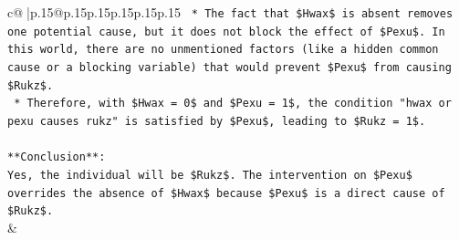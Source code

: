 \documentclass{article}
\begin{document}
{\begin{supertabular}{c@{$\;$}|p{.15\linewidth}@{}p{.15\linewidth}p{.15\linewidth}p{.15\linewidth}p{.15\linewidth}p{.15\linewidth}}
{{{\texttt{    *   The fact that \$Hwax\$ is absent removes one potential cause, but it does not block the effect of \$Pexu\$. In this world, there are no unmentioned factors (like a hidden common cause or a blocking variable) that would prevent \$Pexu\$ from causing \$Rukz\$.} \\
\texttt{    *   Therefore, with \$Hwax = 0\$ and \$Pexu = 1\$, the condition "hwax or pexu causes rukz" is satisfied by \$Pexu\$, leading to \$Rukz = 1\$.} \\
\\ 
\texttt{**Conclusion**:} \\
\texttt{Yes, the individual will be \$Rukz\$. The intervention on \$Pexu\$ overrides the absence of \$Hwax\$ because \$Pexu\$ is a direct cause of \$Rukz\$.} \\
            }
        }
    }
    & \\ \\


\end{supertabular}}
\end{document}

